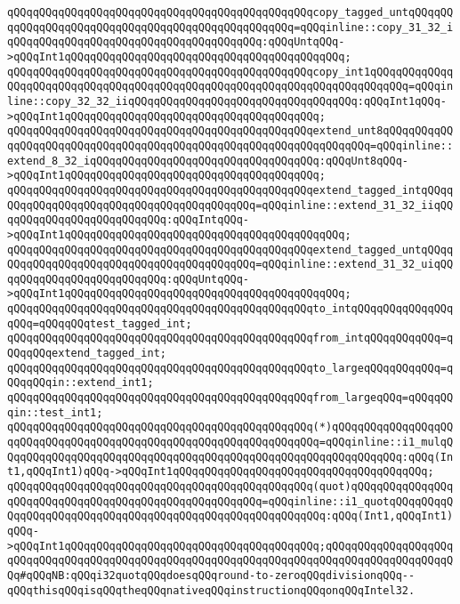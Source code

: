 \verb|qQQqqQQqqQQqqQQqqQQqqQQqqQQqqQQqqQQqqQQqqQQqqQQqcopy_tagged_untqQQqqQQqqQQqqQQqqQQqqQQqqQQqqQQqqQQqqQQqqQQqqQQqqQQq=qQQqinline::copy_31_32_iqQQqqQQqqQQqqQQqqQQqqQQqqQQqqQQqqQQqqQQq:qQQqUntqQQq->qQQqInt1qQQqqQQqqQQqqQQqqQQqqQQqqQQqqQQqqQQqqQQqqQQq;|\newline
\verb|qQQqqQQqqQQqqQQqqQQqqQQqqQQqqQQqqQQqqQQqqQQqqQQqcopy_int1qQQqqQQqqQQqqQQqqQQqqQQqqQQqqQQqqQQqqQQqqQQqqQQqqQQqqQQqqQQqqQQqqQQqqQQqqQQq=qQQqinline::copy_32_32_iiqQQqqQQqqQQqqQQqqQQqqQQqqQQqqQQqqQQq:qQQqInt1qQQq->qQQqInt1qQQqqQQqqQQqqQQqqQQqqQQqqQQqqQQqqQQqqQQq;|\newline
\verb|qQQqqQQqqQQqqQQqqQQqqQQqqQQqqQQqqQQqqQQqqQQqqQQqextend_unt8qQQqqQQqqQQqqQQqqQQqqQQqqQQqqQQqqQQqqQQqqQQqqQQqqQQqqQQqqQQqqQQqqQQq=qQQqinline::extend_8_32_iqQQqqQQqqQQqqQQqqQQqqQQqqQQqqQQqqQQq:qQQqUnt8qQQq->qQQqInt1qQQqqQQqqQQqqQQqqQQqqQQqqQQqqQQqqQQqqQQq;|\newline
\verb|qQQqqQQqqQQqqQQqqQQqqQQqqQQqqQQqqQQqqQQqqQQqqQQqextend_tagged_intqQQqqQQqqQQqqQQqqQQqqQQqqQQqqQQqqQQqqQQqqQQq=qQQqinline::extend_31_32_iiqQQqqQQqqQQqqQQqqQQqqQQqqQQq:qQQqIntqQQq->qQQqInt1qQQqqQQqqQQqqQQqqQQqqQQqqQQqqQQqqQQqqQQqqQQq;|\newline
\verb|qQQqqQQqqQQqqQQqqQQqqQQqqQQqqQQqqQQqqQQqqQQqqQQqextend_tagged_untqQQqqQQqqQQqqQQqqQQqqQQqqQQqqQQqqQQqqQQqqQQq=qQQqinline::extend_31_32_uiqQQqqQQqqQQqqQQqqQQqqQQqqQQq:qQQqUntqQQq->qQQqInt1qQQqqQQqqQQqqQQqqQQqqQQqqQQqqQQqqQQqqQQqqQQq;|\newline
\newline
\verb|qQQqqQQqqQQqqQQqqQQqqQQqqQQqqQQqqQQqqQQqqQQqqQQqto_intqQQqqQQqqQQqqQQqqQQq=qQQqqQQqtest_tagged_int;|\newline
\verb|qQQqqQQqqQQqqQQqqQQqqQQqqQQqqQQqqQQqqQQqqQQqqQQqfrom_intqQQqqQQqqQQq=qQQqqQQqextend_tagged_int;|\newline
\verb|qQQqqQQqqQQqqQQqqQQqqQQqqQQqqQQqqQQqqQQqqQQqqQQqto_largeqQQqqQQqqQQq=qQQqqQQqin::extend_int1;|\newline
\verb|qQQqqQQqqQQqqQQqqQQqqQQqqQQqqQQqqQQqqQQqqQQqqQQqfrom_largeqQQq=qQQqqQQqin::test_int1;|\newline
\newline
\verb|qQQqqQQqqQQqqQQqqQQqqQQqqQQqqQQqqQQqqQQqqQQqqQQq(*)qQQqqQQqqQQqqQQqqQQqqQQqqQQqqQQqqQQqqQQqqQQqqQQqqQQqqQQqqQQqqQQqqQQq=qQQqinline::i1_mulqQQqqQQqqQQqqQQqqQQqqQQqqQQqqQQqqQQqqQQqqQQqqQQqqQQqqQQqqQQqqQQq:qQQq(Int1,qQQqInt1)qQQq->qQQqInt1qQQqqQQqqQQqqQQqqQQqqQQqqQQqqQQqqQQqqQQq;|\newline
\verb|qQQqqQQqqQQqqQQqqQQqqQQqqQQqqQQqqQQqqQQqqQQqqQQq(quot)qQQqqQQqqQQqqQQqqQQqqQQqqQQqqQQqqQQqqQQqqQQqqQQqqQQqqQQq=qQQqinline::i1_quotqQQqqQQqqQQqqQQqqQQqqQQqqQQqqQQqqQQqqQQqqQQqqQQqqQQqqQQqqQQq:qQQq(Int1,qQQqInt1)qQQq->qQQqInt1qQQqqQQqqQQqqQQqqQQqqQQqqQQqqQQqqQQqqQQq;qQQqqQQqqQQqqQQqqQQqqQQqqQQqqQQqqQQqqQQqqQQqqQQqqQQqqQQqqQQqqQQqqQQqqQQqqQQqqQQqqQQqqQQqqQQq#qQQqNB:qQQqi32quotqQQqdoesqQQqround-to-zeroqQQqdivisionqQQq--qQQqthisqQQqisqQQqtheqQQqnativeqQQqinstructionqQQqonqQQqIntel32.|\newline
